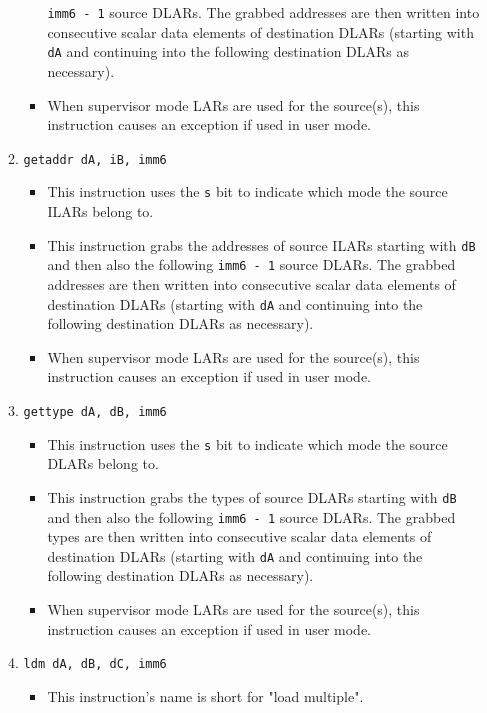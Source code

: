 \documentclass{article}
\begin{document}
\begin{itemize}
\begin{enumerate}
\begin{itemize}
					\texttt{imm6 - 1} source DLARs. The grabbed addresses
					are then written into consecutive scalar data elements
					of destination DLARs (starting with \texttt{dA} and
					continuing into the following destination DLARs as
					necessary).
				\item When supervisor mode LARs are used for the source(s),
					this instruction causes an exception if used in user
					mode.
				\end{itemize}
			\item \texttt{getaddr dA, iB, imm6}
				\begin{itemize}
				\item This instruction uses the \texttt{s} bit to indicate
					which mode the source ILARs belong to.
				\item This instruction grabs the addresses of source ILARs
					starting with \texttt{dB} and then also the following
					\texttt{imm6 - 1} source DLARs. The grabbed addresses
					are then written into consecutive scalar data elements
					of destination DLARs (starting with \texttt{dA} and
					continuing into the following destination DLARs as
					necessary).
				\item When supervisor mode LARs are used for the source(s),
					this instruction causes an exception if used in user
					mode.
				\end{itemize}
			\item \texttt{gettype dA, dB, imm6}
				\begin{itemize}
				\item This instruction uses the \texttt{s} bit to indicate
					which mode the source DLARs belong to.
				\item This instruction grabs the types of source DLARs
					starting with \texttt{dB} and then also the following
					\texttt{imm6 - 1} source DLARs. The grabbed types are
					then written into consecutive scalar data elements of
					destination DLARs (starting with \texttt{dA} and
					continuing into the following destination DLARs as
					necessary).
				\item When supervisor mode LARs are used for the source(s),
					this instruction causes an exception if used in user
					mode.
				\end{itemize}
			\item \texttt{ldm dA, dB, dC, imm6}
				\begin{itemize}
				\item This instruction's name is short for "load multiple".

\end{itemize}
\end{enumerate}
\end{itemize}
\end{document}
